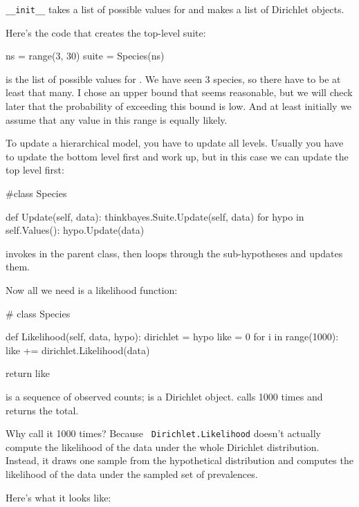 \documentclass[12pt]{book}
\theoremstyle{exercise}
\begin{document}
\verb"__init__" takes a list of possible values for  and
makes a list of Dirichlet objects.

Here's the code that creates the top-level suite:

\begin{code}
    ns = range(3, 30)
    suite = Species(ns)
\end{code}

 is the list of possible values for .  We have seen 3
species, so there have to be at least that many.  I chose an upper
bound that seems reasonable, but we will check later that the
probability of exceeding this bound is low.  And at least initially
we assume that any value in this range is equally likely.

To update a hierarchical model, you have to update all levels.
Usually you have to update the bottom
level first and work up, but in this case we can
update the top level first:

\begin{code}
#class Species

    def Update(self, data):
        thinkbayes.Suite.Update(self, data)
        for hypo in self.Values():
            hypo.Update(data)
\end{code}

 invokes  in the parent class,
then loops through the sub-hypotheses and updates them.

Now all we need is a likelihood function:

\begin{code}
# class Species

    def Likelihood(self, data, hypo):
        dirichlet = hypo
        like = 0
        for i in range(1000):
            like += dirichlet.Likelihood(data)

        return like
\end{code}

 is a sequence of
observed counts;  is a Dirichlet object.
 calls
 1000 times and returns the total.

Why call it 1000 times?  Because {\tt
  Dirichlet.Likelihood} doesn't actually compute the likelihood of the
data under the whole Dirichlet distribution.  Instead, it draws one
sample from the hypothetical distribution and computes the likelihood
of the data under the sampled set of prevalences.

Here's what it looks like:
\end{document}
